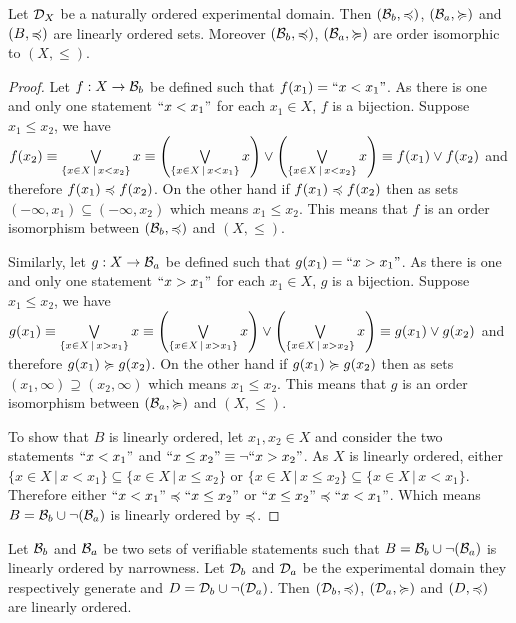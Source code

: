 \documentclass[11pt,letterpaper,fleqn]{memoir} %
\begin{document}
\begin{mathSection}
\begin{prop}\label{3_prop_basis_ordering}
	Let $\mathcal{D}_X$ be a naturally ordered experimental domain. Then $(\mathcal{B}_b, \preccurlyeq)$, $(\mathcal{B}_a, \succcurlyeq)$ and $(B, \preccurlyeq)$ are linearly ordered sets. Moreover $(\mathcal{B}_b, \preccurlyeq)$, $(\mathcal{B}_a, \succcurlyeq)$ are order isomorphic to $(X, \leq)$.
\end{prop}
\begin{proof}
	Let $f : X \to \mathcal{B}_b$ be defined such that $f(x_1) = ``x < x_1"$. As there is one and only one statement $``x < x_1"$ for each $x_1 \in X$, $f$ is a bijection. Suppose $x_1 \leq x_2$, we have $f(x_2) \equiv \bigvee\limits_{\{x \in X \, | \, x < x_2\}} x \equiv \left( \bigvee\limits_{\{x \in X \, | \, x < x_1\}} x\right) \vee \left( \bigvee\limits_{\{x \in X \, | \, x < x_2\}} x \right)\equiv f(x_1) \vee f(x_2)$ and therefore $f(x_1) \preccurlyeq f(x_2)$. On the other hand if $f(x_1) \preccurlyeq f(x_2)$ then as sets $(-\infty, x_1) \subseteq (-\infty, x_2)$ which means $x_1 \leq x_2$. This means that $f$ is an order isomorphism between $(\mathcal{B}_b, \preccurlyeq)$ and $(X, \leq)$.
	
	Similarly, let $g : X \to \mathcal{B}_a$ be defined such that $g(x_1) = ``x > x_1"$. As there is one and only one statement $``x > x_1"$ for each $x_1 \in X$, $g$ is a bijection. Suppose $x_1 \leq x_2$, we have $g(x_1) \equiv \bigvee\limits_{\{x \in X \, | \, x > x_1\}} x \equiv \left( \bigvee\limits_{\{x \in X \, | \, x > x_1\}} x \right) \vee \left(\bigvee\limits_{\{x \in X \, | \, x > x_2\}} x \right) \equiv g(x_1) \vee g(x_2)$ and therefore $g(x_1) \succcurlyeq g(x_2)$. On the other hand if $g(x_1) \succcurlyeq g(x_2)$ then as sets $(x_1, \infty) \supseteq (x_2, \infty)$ which means $x_1 \leq x_2$. This means that $g$ is an order isomorphism between $(\mathcal{B}_a, \succcurlyeq)$ and $(X, \leq)$.
	
	To show that $B$ is linearly ordered, let $x_1, x_2 \in X$ and consider the two statements $``x < x_1"$ and $``x \leq x_2"\equiv \neg ``x > x_2"$. As $X$ is linearly ordered, either $\{x \in X \, | \, x < x_1\} \subseteq \{x \in X \, | \, x \leq x_2\}$ or $\{x \in X \, | \, x \leq x_2\} \subseteq \{x \in X \, | \, x < x_1\}$. Therefore either $``x < x_1" \preccurlyeq ``x \leq x_2"$ or $``x \leq x_2" \preccurlyeq ``x < x_1"$. Which means $B = \mathcal{B}_b \cup \neg(\mathcal{B}_a)$ is linearly ordered by $\preccurlyeq$.
\end{proof}

\begin{prop}\label{3_prop_generated_order}
	Let $\mathcal{B}_b$ and $\mathcal{B}_a$ be two sets of verifiable statements such that $B = \mathcal{B}_b \cup \neg(\mathcal{B}_a)$ is linearly ordered by narrowness. Let $\mathcal{D}_b$ and $\mathcal{D}_a$ be the experimental domain they respectively generate and $D = \mathcal{D}_b \cup \neg(\mathcal{D}_a)$. Then $(\mathcal{D}_b, \preccurlyeq)$, $(\mathcal{D}_a, \succcurlyeq)$ and $(D, \preccurlyeq)$ are linearly ordered.
\end{prop}


\end{mathSection}
\end{document}
